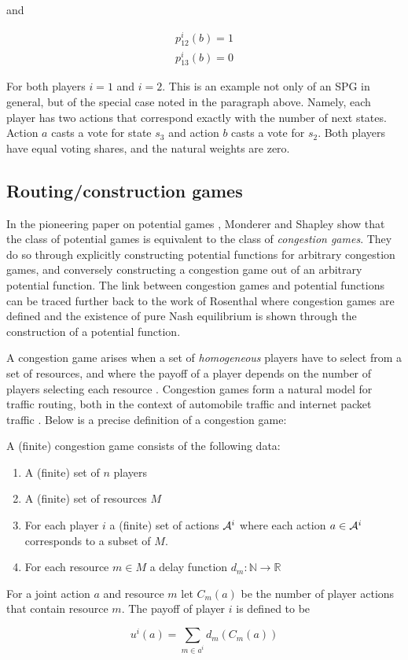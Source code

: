 and

\begin{align*}
p^i_{12}(b) = 1 \\
p^i_{13}(b) = 0
\end{align*}


For both players $i = 1$ and $i = 2$. This is an example not only of an SPG in general, but of the special case noted in the paragraph above. Namely, each player has two actions that correspond exactly with the number of next states. Action $a$ casts a vote for state $s_3$ and action $b$ casts a vote for $s_2$. Both players have equal voting shares, and the natural weights are zero. 

\subsection{Routing/construction games}

In the pioneering paper on potential games \cite{monderer1996potential}, Monderer and Shapley show that the class of potential games is equivalent to the class of {\em congestion games}. They do so through explicitly constructing potential functions for arbitrary congestion games, and conversely constructing a congestion game out of an arbitrary potential function. The link between congestion games and potential functions can be traced further back to the work of Rosenthal \cite{rosenthal1973class} where congestion games are defined and the existence of pure Nash equilibrium is shown through the construction of a potential function. 

A congestion game arises when a set of {\em homogeneous} players have to select from a set of resources, and where the payoff of a player depends on the number of players selecting each resource \cite{monderer1996potential}. Congestion games form a natural model for traffic routing, both in the context of automobile traffic \cite{wang2013distributed} and internet packet traffic \cite{gibbens1999resource}. Below is a precise definition of a congestion game:

\begin{mydef}
A (finite) congestion game consists of the following data:
\begin{enumerate}
    \item A (finite) set of $n$ players
    \item A (finite) set of resources $M$
    \item For each player $i$ a (finite) set of actions $\AA^i$ where each action $a \in \AA^i$ corresponds to a subset of $M$.
    \item For each resource $m \in M$ a delay function $d_m: \mathbb{N} \rightarrow \mathbb{R}$
\end{enumerate}

For a joint action $a$ and resource $m$ let $C_m(a)$ be the number of player actions that contain resource $m$. The payoff of player $i$ is defined to be

\begin{equation}
    u^i(a) = \sum_{m \in a^i} d_m(C_m(a))
\end{equation}

\end{mydef}

